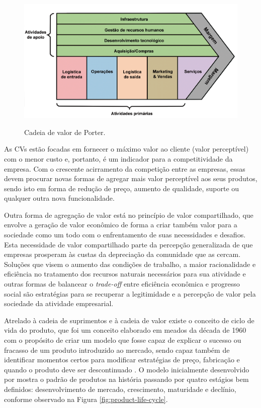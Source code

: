 \documentclass[
	12pt,				%
	oneside,			%
	a4paper,			%
	english,			%
	brazil				%
]{abntex2}
\begin{document}
	\begin{figure}[H]
		\centering
		\caption{Cadeia de valor de Porter.}
		\includegraphics[width=1\textwidth]{porter-cadeia-de-valor.png}
		\label{fig:porter-cadeia-de-valor}
	\end{figure}
	
	
	As CVs estão focadas em fornecer o máximo valor ao cliente (valor perceptível) com o menor custo e, portanto, é um indicador para a competitividade da empresa. Com o crescente acirramento da competição entre as empresas, essas devem procurar novas formas de agregar mais valor perceptível aos seus produtos, sendo isto em forma de redução de preço, aumento de qualidade, suporte ou qualquer outra nova funcionalidade.
	
	Outra forma de agregação de valor está no princípio de valor compartilhado, que envolve a geração de valor econômico de forma a criar também valor para a sociedade como um todo \cite{porter2011valorcompartilhado} com o enfrentamento de suas necessidades e desafios. Esta necessidade de valor compartilhado parte da percepção generalizada de que empresas prosperam às custas da depreciação da comunidade que as cercam. Soluções que visem o aumento das condições de trabalho, a maior racionalidade e eficiência no tratamento dos recursos naturais necessários para sua atividade e outras formas de balancear o \textit{trade-off} entre eficiência econômica e progresso social são estratégias para se recuperar a legitimidade e a percepção de valor pela sociedade da atividade empresarial.
	
	Atrelado à cadeia de suprimentos e à cadeia de valor existe o conceito de ciclo de vida do produto, que foi um conceito elaborado em meados da década de 1960 com o propósito de criar um modelo que fosse capaz de explicar o sucesso ou fracasso de um produto introduzido ao mercado, sendo capaz também de identificar momentos certos para modificar estratégias de preço, fabricação e quando o produto deve ser descontinuado \cite{cao2012lifecycle}. O modelo inicialmente desenvolvido por  mostra o padrão de produtos na história passando por quatro estágios bem definidos: desenvolvimento de mercado, crescimento, maturidade e declínio, conforme observado na Figura \ref{fig:product-life-cycle}.
	
\end{document}
